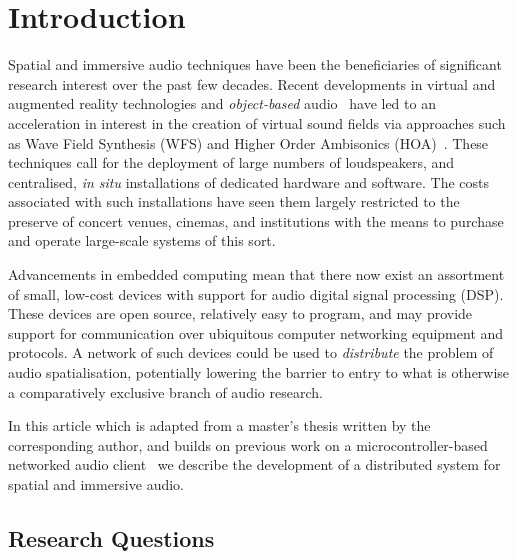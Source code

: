 \section{Introduction}\label{sec:introduction}

Spatial and immersive audio techniques have been the beneficiaries of
significant research interest over the past few decades.
Recent developments in virtual and augmented reality technologies and
\textit{object-based} audio~\citep{geier_object-based_2010} have led to an
acceleration in interest in the creation of virtual sound fields via approaches
such as Wave Field Synthesis (WFS) and Higher Order Ambisonics
(HOA)~\citep{berkhout_acoustic_1993,ahrens_theory_2008,daniel_further_2003,
    frank_producing_2015}.
These techniques call for the deployment of large numbers of loudspeakers, and
centralised, \textit{in situ} installations of dedicated hardware and software.
The costs associated with such installations have seen them largely restricted
to the preserve of concert venues, cinemas, and institutions with the means to
purchase and operate large-scale systems of this sort.

Advancements in embedded computing mean that there now exist an assortment of
small, low-cost devices with support for audio digital signal processing (DSP).
These devices are open source, relatively easy to program, and may provide
support for communication over ubiquitous computer networking equipment and
protocols.
A network of such devices could be used to \textit{distribute} the problem of
audio spatialisation, potentially lowering the barrier to entry to what is
otherwise a comparatively exclusive branch of audio research.

In this article \textemdash{} which is adapted from a master's thesis written by
the corresponding author, and builds on previous work on a microcontroller-based
networked audio client~\citep{rushton_microcontroller-based_2023} \textemdash{}
we describe the development of a distributed system for spatial and immersive
audio.






\subsection{Research Questions}\label{subsec:research-questions}

